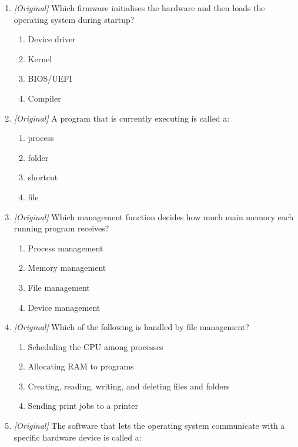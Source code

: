 \documentclass[11pt]{article}
\begin{document}
\begin{enumerate}[label=\textbf{Q\arabic*.}, leftmargin=*]
\begin{enumerate}[label=\Alph*.]
    \item Booting
    \item Formatting
    \item Compiling
    \item Defragmenting
  \end{enumerate}
\item \textit{[Original]} Which firmware initialises the hardware and then
  loads the operating system during startup?
  \begin{enumerate}[label=\Alph*.]
    \item Device driver
    \item Kernel
    \item BIOS/UEFI
    \item Compiler
  \end{enumerate}
\item \textit{[Original]} A program that is currently executing is called a:
  \begin{enumerate}[label=\Alph*.]
    \item process
    \item folder
    \item shortcut
    \item file
  \end{enumerate}
\item \textit{[Original]} Which management function decides how much main
  memory each running program receives?
  \begin{enumerate}[label=\Alph*.]
    \item Process management
    \item Memory management
    \item File management
    \item Device management
  \end{enumerate}
\item \textit{[Original]} Which of the following is handled by file management?
  \begin{enumerate}[label=\Alph*.]
    \item Scheduling the CPU among processes
    \item Allocating RAM to programs
    \item Creating, reading, writing, and deleting files and folders
    \item Sending print jobs to a printer
  \end{enumerate}
\item \textit{[Original]} The software that lets the operating system
  communicate with a specific hardware device is called a:

\end{enumerate}
\end{document}
